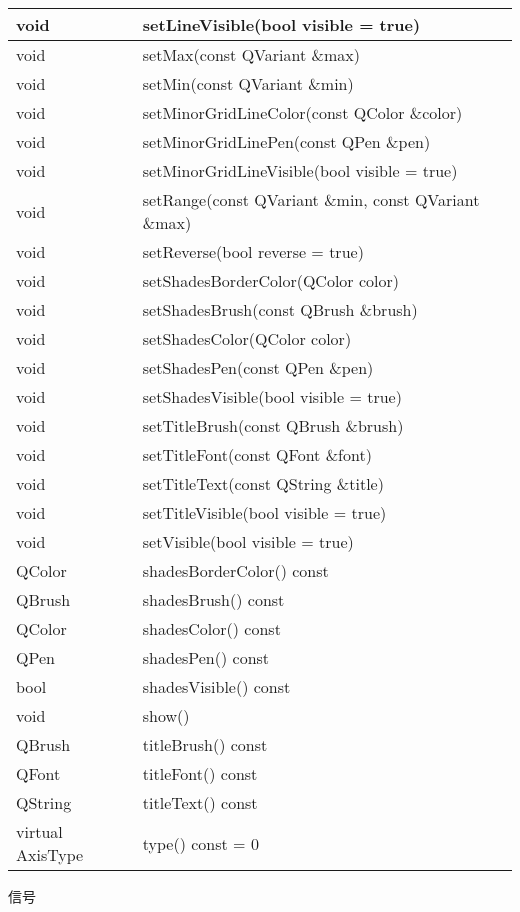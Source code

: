 \begin{longtable}{|l|l|}
\hline
void	&setLineVisible(bool visible = true)\\
\hline
void	&setMax(const QVariant \&max)\\
\hline
void	&setMin(const QVariant \&min)\\
\hline
void	&setMinorGridLineColor(const QColor \&color)\\
\hline
void	&setMinorGridLinePen(const QPen \&pen)\\
\hline
void	&setMinorGridLineVisible(bool visible = true)\\
\hline
void	&setRange(const QVariant \&min, const QVariant \&max)\\
\hline
void	&setReverse(bool reverse = true)\\
\hline
void	&setShadesBorderColor(QColor color)\\
\hline
void	&setShadesBrush(const QBrush \&brush)\\
\hline
void	&setShadesColor(QColor color)\\
\hline
void	&setShadesPen(const QPen \&pen)\\
\hline
void&	setShadesVisible(bool visible = true)\\
\hline
void&	setTitleBrush(const QBrush \&brush)\\
\hline
void&	setTitleFont(const QFont \&font)\\
\hline
void&	setTitleText(const QString \&title)\\
\hline
void&	setTitleVisible(bool visible = true)\\
\hline
void&	setVisible(bool visible = true)\\
\hline
QColor&	shadesBorderColor() const\\
\hline
QBrush&	shadesBrush() const\\
\hline
QColor&	shadesColor() const\\
\hline
QPen&	shadesPen() const\\
\hline
bool&	shadesVisible() const\\
\hline
void&	show()\\
\hline
QBrush&	titleBrush() const\\
\hline
QFont&	titleFont() const\\
\hline
QString&	titleText() const\\
\hline
virtual AxisType &type() const = 0\\
\hline
\end{longtable}

信号

